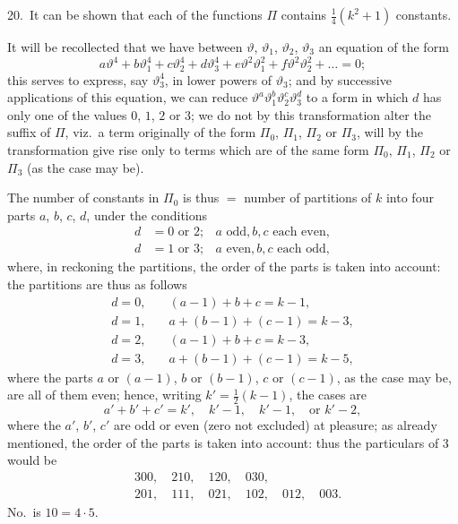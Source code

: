 \documentclass[11pt,a4paper]{article}
\theoremstyle{definition}
\begin{document}
\medskip

20.\ It can be shown that each of the functions $\Pi$ contains $\frac{1}{4}(k^2 + 1)$ constants.

It will be recollected that we have between $\vartheta$, $\vartheta_1$, $\vartheta_2$, $\vartheta_3$ an equation of the form
\[
a\vartheta^4 + b\vartheta_1^4 + c\vartheta_2^4 + d\vartheta_3^4 + e\vartheta^2\vartheta_1^2 + f\vartheta^2\vartheta_2^2 + \ldots = 0;
\]
this serves to express, say $\vartheta_3^4$, in lower powers of $\vartheta_3$; and by successive applications of this equation, we can reduce $\vartheta^a\vartheta_1^b\vartheta_2^c\vartheta_3^d$ to a form in which $d$ has only one of the values $0$, $1$, $2$ or $3$; we do not by this transformation alter the suffix of $\Pi$, viz.\ a term originally of the form $\Pi_0$, $\Pi_1$, $\Pi_2$ or $\Pi_3$, will by the transformation give rise only to terms which are of the same form $\Pi_0$, $\Pi_1$, $\Pi_2$ or $\Pi_3$ (as the case may be).

The number of constants in $\Pi_0$ is thus $=$ number of partitions of $k$ into four parts $a$, $b$, $c$, $d$, under the conditions
\begin{align*}
d &= 0 \text{ or } 2; & a \text{ odd}, b, c \text{ each even},\\
d &= 1 \text{ or } 3; & a \text{ even}, b, c \text{ each odd},
\end{align*}
where, in reckoning the partitions, the order of the parts is taken into account:
the partitions are thus as follows
\begin{align*}
d = 0, &\quad (a - 1) + b + c = k - 1,\\
d = 1, &\quad a + (b - 1) + (c - 1) = k - 3,\\
d = 2, &\quad (a - 1) + b + c = k - 3,\\
d = 3, &\quad a + (b - 1) + (c - 1) = k - 5,
\end{align*}
where the parts $a$ or $(a - 1)$, $b$ or $(b - 1)$, $c$ or $(c - 1)$, as the case may be, are all of them even; hence, writing $k' = \frac{1}{2}(k - 1)$, the cases are
\[
a' + b' + c' = k', \quad k' - 1, \quad k' - 1, \quad \text{or } k' - 2,
\]
where the $a'$, $b'$, $c'$ are odd or even (zero not excluded) at pleasure; as already mentioned, the order of the parts is taken into account: thus the particulars of $3$ would be
\begin{align*}
&300, \quad 210, \quad 120, \quad 030,\\
&201, \quad 111, \quad 021, \quad 102, \quad 012, \quad 003.
\end{align*}
No.\ is $10 = 4 \cdot 5$.
\end{document}
